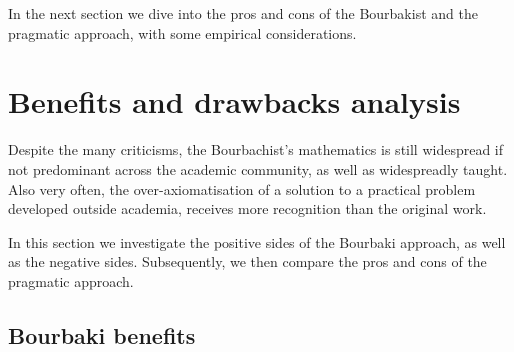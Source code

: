\documentclass[]{scrartcl}
\theoremstyle{definition}
\begin{document}


In the next section we dive into the pros and cons of the Bourbakist and the pragmatic approach, with some empirical considerations.

\section{Benefits and drawbacks analysis}

Despite the many criticisms, the Bourbachist's mathematics is still widespread if not predominant across the academic community, as well as widespreadly taught.
Also very often, the over-axiomatisation of a solution to a practical problem developed outside academia, receives more recognition than the original work.


In this section we investigate the positive sides of the Bourbaki approach, as well as the negative sides. Subsequently, we then compare the pros and cons of the pragmatic approach.

\subsection*{Bourbaki benefits}
\end{document}
